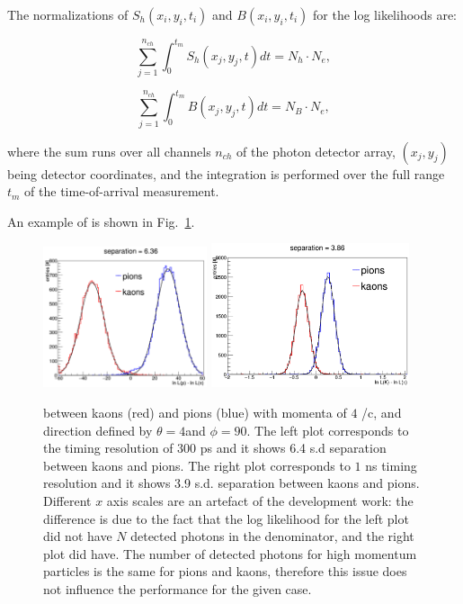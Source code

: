The normalizations of $S_{h} (x_{i}, y_{i}, t_{i})$ and $B(x_{i}, y_{i}, t_{i})$ for the log likelihoods are:

\begin{equation}
\sum_{j=1}^{n_{ch}} \int_{0}^{t_{m}} S_{h}(x_{j}, y_{j}, t) dt = N_{h}\cdot N_{e},
\label{eq:norm1}
\end{equation}

\begin{equation}
\sum_{j=1}^{n_{ch}} \int_{0}^{t_{m}} B(x_{j}, y_{j}, t) dt = N_{B} \cdot N_{e},
\label{eq:norm2}
\end{equation}

\noindent where the sum runs over all channels $n_{ch}$ of the photon detector array, $(x_{j}, y_{j})$ being detector coordinates, and the integration is performed over the full range $t_{m}$ of the time-of-arrival measurement.

An example of \deltall is shown in Fig.~\ref{pic:sepTI}.

\begin{figure}[!h]
\centering
\includegraphics[width=0.43\textwidth]{pics/sepTI300.png} \hspace{0.5cm} \includegraphics[width=0.52\textwidth]{pics/sepTI1000.png}
\caption{\label{pic:sepTI}
\deltall between kaons (red) and pions (blue) with momenta of $4$ {\gev}/c, and direction defined by $\theta = 4$\mydeg and $\phi = 90$\mydeg. The left plot corresponds to the timing resolution of $300$ ps and it shows 6.4 s.d separation between kaons and pions. The right plot corresponds to $1$ ns timing resolution and it shows 3.9 s.d. separation between kaons and pions. \newline \footnotesize{Different $x$ axis scales are an artefact of the development work: the difference is due to the fact that the log likelihood for the left plot did not have $N$ detected photons in the denominator, and the right plot did have. The number of detected photons for high momentum particles is the same for pions and kaons, therefore this issue does not influence the performance for the given case. }
}
\end{figure}

